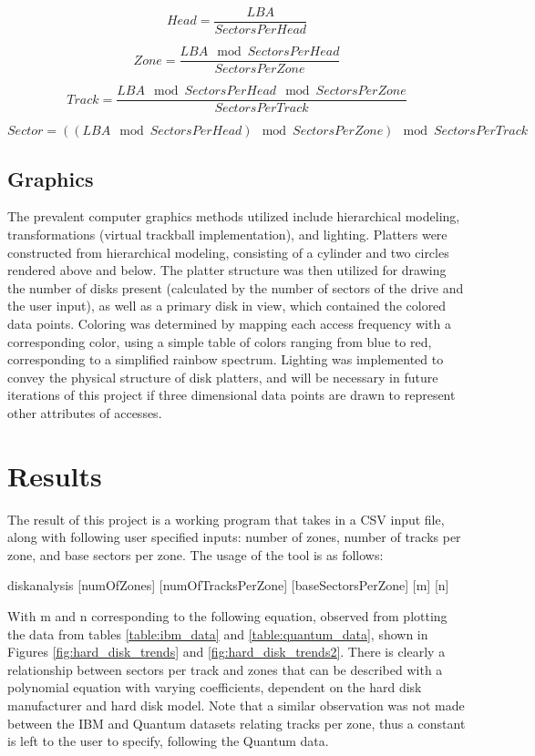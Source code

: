 \documentclass[12pt]{ucthesis}
\begin{document}
$$Head = \frac{LBA}{Sectors Per Head}$$

$$Zone = \frac{LBA \mod{Sectors Per Head}}{Sectors Per Zone}$$

$$Track = \frac{LBA \mod{Sectors Per Head} \mod{Sectors Per Zone}}{Sectors Per Track}$$

$$Sector = ((LBA \mod{Sectors Per Head}) \mod{Sectors Per Zone}) \mod{Sectors Per Track}$$


\subsection{Graphics}
\label{hard_disk_graphics}

The prevalent computer graphics methods utilized include hierarchical modeling, transformations (virtual trackball implementation), and lighting. Platters were constructed from hierarchical modeling, consisting of a cylinder and two circles rendered above and below. The platter structure was then utilized for drawing the number of disks present (calculated by the number of sectors of the drive and the user input), as well as a primary disk in view, which contained the colored data points. Coloring was determined by mapping each access frequency with a corresponding color, using a simple table of colors ranging from blue to red, corresponding to a simplified rainbow spectrum. Lighting was implemented to convey the physical structure of disk platters, and will be necessary in future iterations of this project if three dimensional data points are drawn to represent other attributes of accesses.

\section{Results}
\label{hard_disk_results}

The result of this project is a working program that takes in a CSV input file, along with following user specified inputs: number of zones, number of tracks per zone, and base sectors per zone. The usage of the tool is as follows:\newline

\noindent diskanalysis [numOfZones] [numOfTracksPerZone] [baseSectorsPerZone] [m] [n]\newline

\noindent With m and n corresponding to the following equation, observed from plotting the data from tables \ref{table:ibm_data} and \ref{table:quantum_data}, shown in Figures \ref{fig:hard_disk_trends} and \ref{fig:hard_disk_trends2}. There is clearly a relationship between sectors per track and zones that can be described with a polynomial equation with varying coefficients, dependent on the hard disk manufacturer and hard disk model. Note that a similar observation was not made between the IBM and Quantum datasets relating tracks per zone, thus a constant is left to the user to specify, following the Quantum data.
\end{document}
